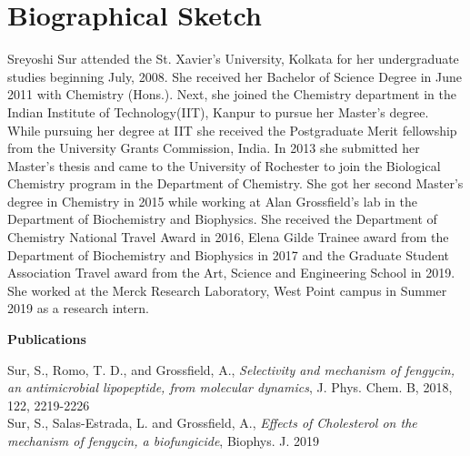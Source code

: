 

\section*{Biographical Sketch}

Sreyoshi Sur attended the St. Xavier's University, Kolkata for her undergraduate 
studies beginning July, 2008. She received her Bachelor of Science Degree in June 
2011 with Chemistry (Hons.). Next, she joined the Chemistry department in the Indian 
Institute of Technology(IIT), Kanpur to pursue her Master's degree. While pursuing 
her degree at IIT she received the Postgraduate Merit fellowship from the University 
Grants Commission, India. In 2013 she submitted her Master's thesis and came to the 
University of Rochester to join the Biological Chemistry program in the Department of
Chemistry. She got her second Master's degree in Chemistry in 2015 while working at Alan Grossfield's lab in the Department of Biochemistry and Biophysics. She received the Department of Chemistry National Travel Award in 2016, Elena Gilde Trainee award from the Department of Biochemistry and Biophysics in 2017 and the Graduate Student Association Travel award from the Art, Science and Engineering School in 2019. She worked at the Merck Research Laboratory, West Point campus in Summer 2019 as a research intern.

\noindent \textbf{Publications}


Sur, S., Romo, T. D., and Grossfield, A., 
\emph{Selectivity and mechanism of fengycin, an antimicrobial lipopeptide, from molecular dynamics}, J. Phys. Chem. B, 2018, 122, 2219-2226\\
Sur, S., Salas-Estrada, L. and Grossfield, A.,
\emph{Effects of Cholesterol on the mechanism of fengycin, a biofungicide},
Biophys. J. 2019

\newpage